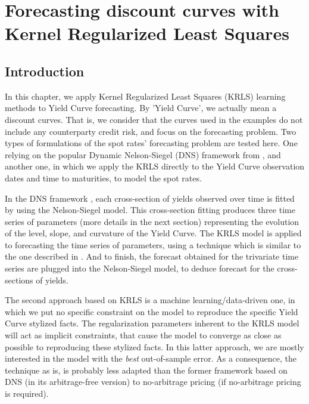 %
\chapter{Forecasting discount curves with Kernel Regularized Least Squares}
\label{sec:discount_curve_krls}


\section{Introduction}

In this chapter, we apply Kernel Regularized Least Squares (KRLS) learning methods to Yield Curve forecasting. By 'Yield Curve', we actually mean a discount curves. That is, we consider that the curves used in the examples do not include any counterparty credit risk, and focus on the forecasting problem. Two types of formulations of the spot rates' forecasting problem are tested here. One relying on the popular Dynamic Nelson-Siegel (DNS) framework from \cite{diebold2006forecasting}, and another one, in which we apply the KRLS directly to the Yield Curve observation dates and time to maturities, to model the spot rates.

\medskip

In the DNS framework \cite{diebold2006forecasting}, each cross-section of yields observed over time is fitted by using the Nelson-Siegel \cite{nelson1987parsimonious} model. This cross-section fitting produces three time series of parameters (more details in the next section) representing the evolution of the level, slope, and curvature of the Yield Curve. The KRLS model  is applied to forecasting  the time series of parameters, using a technique which is similar to the one described in \cite{exterkate2016nonlinear}. And to finish, the forecast obtained for the trivariate time series are plugged into the Nelson-Siegel model, to deduce forecast for the cross-sections of yields.

\medskip

The second approach based on KRLS is a machine learning/data-driven one, in which we put no  specific constraint on the model to reproduce the specific Yield Curve stylized facts. The regularization parameters inherent to the KRLS model will act as implicit constraints, that cause the model to converge as close as possible to reproducing these stylized facts. In this latter approach, we are mostly interested in the model with the {\it best} out-of-sample error. As a consequence, the technique as is, is probably less adapted than the former framework based on DNS (in its arbitrage-free version) to no-arbitrage pricing (if no-arbitrage pricing is required).

